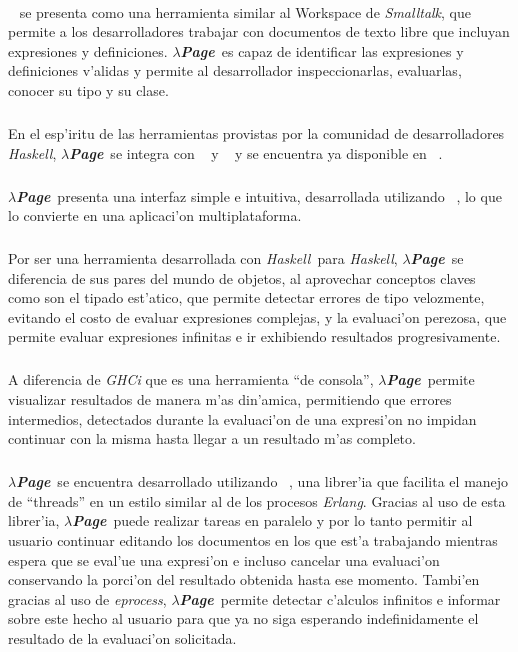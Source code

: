 \documentclass[a4paper]{article}
\newcommand{\haskell}{\textsl{Haskell}}
\newcommand{\hpage}{\textbf{\textsl{$\lambda$Page}}}
\begin{document}
\paragraph{} \htmladdnormallink{\hpage}{http://haskell.hpage.com}~\cite{hpage} se presenta como una herramienta  similar al Workspace de \textit{Smalltalk}, que permite a los desarrolladores trabajar con documentos de texto libre que incluyan expresiones y definiciones.  \hpage\ es capaz de identificar las expresiones y definiciones v'alidas y permite al desarrollador inspeccionarlas, evaluarlas, conocer su tipo y su clase.
\subparagraph{}En el esp'iritu de las herramientas provistas por la comunidad de desarrolladores \haskell, \hpage\ se integra con ~\cite{cabal} y ~\cite{hayoo} y se encuentra ya disponible en ~\cite{hackage}.
\subparagraph{}\hpage\ presenta una interfaz simple e intuitiva, desarrollada utilizando ~\cite{wxhaskell}, lo que lo convierte en una aplicaci'on multiplataforma.
\subparagraph{}Por ser una herramienta desarrollada con \haskell\ para \haskell, \hpage\ se diferencia de sus pares del mundo de objetos, al aprovechar conceptos claves como son el tipado est'atico, que permite detectar errores de tipo velozmente, evitando el costo de evaluar expresiones complejas, y la evaluaci'on perezosa, que permite evaluar expresiones infinitas e ir exhibiendo resultados progresivamente.
\subparagraph{}A diferencia de \textsl{GHCi} que es una herramienta ``de consola'', \hpage\ permite visualizar resultados de manera m'as din'amica, permitiendo que errores intermedios, detectados durante la evaluaci'on de una expresi'on no impidan continuar con la misma hasta llegar a un resultado m'as completo.
\subparagraph{}\hpage\ se encuentra desarrollado utilizando ~\cite{eprocess}, una librer'ia que facilita el manejo de ``threads'' en un estilo similar al de los procesos \textsl{Erlang}.  Gracias al uso de esta librer'ia, \hpage\ puede realizar tareas en paralelo y por lo tanto permitir al usuario continuar editando los documentos en los que est'a trabajando mientras espera que se eval'ue una expresi'on e incluso cancelar una evaluaci'on conservando la porci'on del resultado obtenida hasta ese momento.  Tambi'en gracias al uso de \textsl{eprocess}, \hpage\ permite detectar c'alculos infinitos e informar sobre este hecho al usuario para que ya no siga esperando indefinidamente el resultado de la evaluaci'on solicitada.
\newpage
\end{document}
